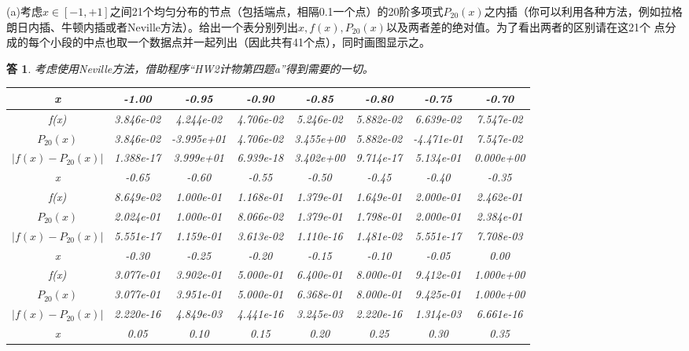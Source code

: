\documentclass[10pt]{ctexart}
\newtheorem*{answer}{答}
\begin{document}
(a)考虑$x\in[-1,+1]$之间21个均匀分布的节点（包括端点，相隔0.1一个点）的20阶多项式$P_{20}(x)$之内插（你可以利用各种方法，例如拉格朗日内插、牛顿内插或者Neville方法）。给出一个表分别列出$x,f(x),P_{20}(x)$以及两者差的绝对值。为了看出两者的区别请在这21个
点分成的每个小段的中点也取一个数据点并一起列出（因此共有41个点），同时画图显示之。
\begin{answer}
    考虑使用Neville方法，借助程序“HW2计物第四题a”得到需要的一切。
    \begin{table}[H]
        \centering
        \begin{tabular}{cccccccc}
            \toprule
            x & -1.00 & -0.95 & -0.90 & -0.85 & -0.80 & -0.75 & -0.70 \\
            \midrule
            f(x) & 3.846e-02 & 4.244e-02 & 4.706e-02 & 5.246e-02 & 5.882e-02 & 6.639e-02 & 7.547e-02\\
            $P_{20}(x)$ & 3.846e-02 & -3.995e+01 & 4.706e-02 & 3.455e+00 & 5.882e-02 & -4.471e-01 & 7.547e-02\\
            $\lvert f(x)-P_{20}(x)\rvert$ & 1.388e-17 & 3.999e+01 & 6.939e-18 & 3.402e+00 & 9.714e-17 & 5.134e-01 & 0.000e+00\\
            \bottomrule
            \toprule
            x & -0.65 & -0.60 & -0.55 & -0.50 & -0.45 & -0.40 & -0.35 \\
            \midrule
            f(x) & 8.649e-02 & 1.000e-01 & 1.168e-01 & 1.379e-01 & 1.649e-01 & 2.000e-01 & 2.462e-01 \\
            $P_{20}(x)$ & 2.024e-01 & 1.000e-01 & 8.066e-02 & 1.379e-01 & 1.798e-01 & 2.000e-01 & 2.384e-01  \\
            $\lvert f(x)-P_{20}(x)\rvert$ & 5.551e-17 & 1.159e-01 & 3.613e-02 & 1.110e-16 & 1.481e-02 & 5.551e-17 & 7.708e-03 \\
            \bottomrule
            \toprule
            x & -0.30 & -0.25 & -0.20 & -0.15 & -0.10 & -0.05 & 0.00 \\
            \midrule
            f(x) &  3.077e-01 & 3.902e-01  & 5.000e-01 & 6.400e-01 & 8.000e-01 & 9.412e-01 & 1.000e+00 \\
            $P_{20}(x)$ &  3.077e-01 & 3.951e-01& 5.000e-01 & 6.368e-01 & 8.000e-01 & 9.425e-01 & 1.000e+00  \\
            $\lvert f(x)-P_{20}(x)\rvert$ & 2.220e-16 & 4.849e-03& 4.441e-16 &  3.245e-03 & 2.220e-16 & 1.314e-03 & 6.661e-16\\
            \bottomrule
            \toprule
            x & 0.05 & 0.10 & 0.15 & 0.20 & 0.25 & 0.30 & 0.35 \\

\end{tabular}
\end{table}
\end{answer}
\end{document}
